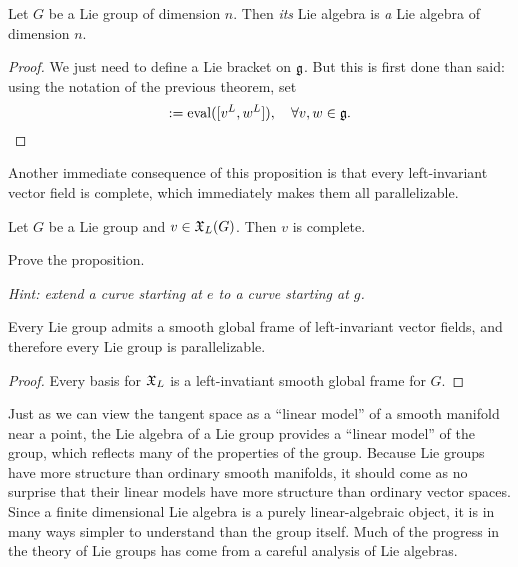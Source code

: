\begin{corollary}
  Let $G$ be a Lie group of dimension $n$.
  Then \emph{its} Lie algebra is \emph{a} Lie algebra of dimension $n$.
\end{corollary}
\begin{proof}
  We just need to define a Lie bracket on $\mathfrak{g}$.
  But this is first done than said: using the notation of the previous theorem, set
  \begin{equation}
    [v,w] := \mathrm{eval}([v^L, w^L]), \quad \forall v,w\in\fg.
  \end{equation}
\end{proof}

Another immediate consequence of this proposition is that every left-invariant vector field is complete, which immediately makes them all parallelizable.

\begin{proposition}\label{prop:XLcomplete}
  Let $G$ be a Lie group and $v\in\mathfrak{X}_L(G)$.
  Then $v$ is complete.
\end{proposition}
\begin{exercise}
  Prove the proposition.
  
  \textit{\small Hint: extend a curve starting at $e$ to a curve starting at $g$.}
\end{exercise}

\begin{corollary}
  Every Lie group admits a smooth global frame of  left-invariant vector fields, and therefore every Lie group is parallelizable.
\end{corollary}
\begin{proof}
  Every basis for $\mathfrak{X}_L$ is a left-invatiant smooth global frame for $G$.
\end{proof}

Just as we can view the tangent space as a ``linear model'' of a smooth manifold near a point, the Lie algebra of a Lie group provides a ``linear model'' of the group, which reflects many of the properties of the group.
Because Lie groups have more structure than ordinary smooth manifolds, it should come as no surprise that their linear models have more structure than ordinary vector spaces.
Since a finite dimensional Lie algebra is a purely linear-algebraic object, it is in many ways simpler to understand than the group itself.
Much of the progress in the theory of Lie groups has come from a careful analysis of Lie algebras.

